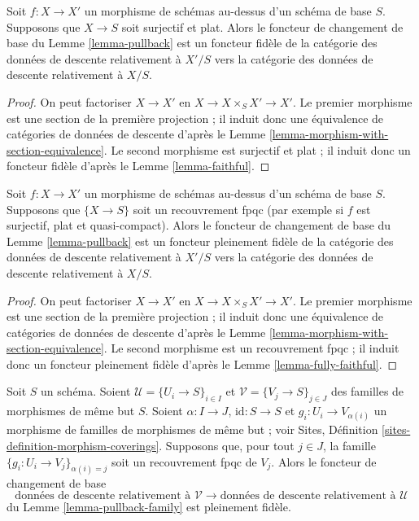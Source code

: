 \begin{lemma}
\label{lemma-morphism-source-faithfully-flat}
Soit $f : X \to X'$ un morphisme de schémas au-dessus d'un schéma de base
$S$. Supposons que $X \to S$ soit surjectif et plat. Alors le foncteur de
changement de base du Lemme \ref{lemma-pullback} est un foncteur fidèle de la
catégorie des données de descente relativement à $X'/S$ vers la catégorie des
données de descente relativement à $X/S$.
\end{lemma}

\begin{proof}
On peut factoriser $X \to X'$ en
$X \to X \times_S X' \to X'$. Le premier morphisme est une section de la
première projection ; il induit donc une équivalence de catégories de données
de descente d'après le
Lemme \ref{lemma-morphism-with-section-equivalence}. Le second morphisme est
surjectif et plat ; il induit donc un foncteur fidèle d'après le
Lemme \ref{lemma-faithful}.
\end{proof}

\begin{lemma}
\label{lemma-morphism-source-fpqc-covering}
Soit $f : X \to X'$ un morphisme de schémas au-dessus d'un schéma de base
$S$. Supposons que $\{X \to S\}$ soit un recouvrement fpqc (par exemple si
$f$ est surjectif, plat et quasi-compact). Alors le foncteur de changement de
base du Lemme \ref{lemma-pullback} est un foncteur pleinement fidèle de la
catégorie des données de descente relativement à $X'/S$ vers la catégorie des
données de descente relativement à $X/S$.
\end{lemma}

\begin{proof}
On peut factoriser $X \to X'$ en
$X \to X \times_S X' \to X'$. Le premier morphisme est une section de la
première projection ; il induit donc une équivalence de catégories de données
de descente d'après le
Lemme \ref{lemma-morphism-with-section-equivalence}. Le second morphisme est un
recouvrement fpqc ; il induit donc un foncteur pleinement fidèle d'après le
Lemme \ref{lemma-fully-faithful}.
\end{proof}

\begin{lemma}
\label{lemma-fpqc-refinement-coverings-fully-faithful}
Soit $S$ un schéma. Soient
$\mathcal{U} = \{U_i \to S\}_{i \in I}$ et
$\mathcal{V} = \{V_j \to S\}_{j \in J}$ des familles de morphismes de même
but $S$. Soient $\alpha : I \to J$, $\text{id} : S \to S$ et
$g_i : U_i \to V_{\alpha(i)}$ un morphisme de familles de morphismes de même
but ; voir Sites, Définition \ref{sites-definition-morphism-coverings}.
Supposons que, pour tout $j \in J$, la famille
$\{g_i : U_i \to V_j\}_{\alpha(i) = j}$ soit un recouvrement fpqc de $V_j$.
Alors le foncteur de changement de base
$$
\text{données de descente relativement à }
\mathcal{V}
\longrightarrow
\text{données de descente relativement à }
\mathcal{U}
$$
du Lemme \ref{lemma-pullback-family} est pleinement fidèle.
\end{lemma}

